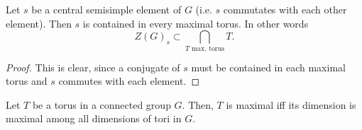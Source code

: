 \begin{corollary}
	Let $s$ be a central semisimple element of $G$ (i.e. $s$ commutates with each other element). Then $s$ is contained in every maximal torus. In other words
	\[ Z(G)_s \subset \bigcap_{T \text{ max. torus}}T. \]
\end{corollary}
\begin{proof}
This is clear, since a conjugate of $s$ must be contained in each maximal torus and $s$ commutes with each element.
\end{proof}
\begin{corollary}
	Let $T$ be a torus in a connected group $G$.
	Then, $T$ is maximal iff its dimension is maximal among all dimensions of tori in $G$.
\end{corollary}